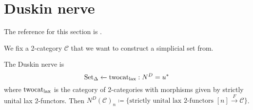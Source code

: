 \section{Duskin nerve}

The reference for this section is \cite[ch. 2.3]{kerodon}.

We fix a 2-category $ \mathcal{ C } $ that we want to construct a simplicial set from.


\begin{defi}
\label{Duskin_nerve_defi}
	The Duskin nerve is 
	\[
		\operatorname{Set}_{\Delta}
		\xleftarrow{}
		\operatorname{twocat_{lax}} : N^D = u^*
	\]
	where $ \operatorname{twocat_{lax}} $ is the category of 2-categories with morphisms given by strictly unital lax 2-functors.
	Then $ N^D ( \mathcal{ C } )_n \coloneqq \{ \text{strictly unital lax 2-functors } [ n ] \xrightarrow{ F } \mathcal{ C } \} $. 
\end{defi}

